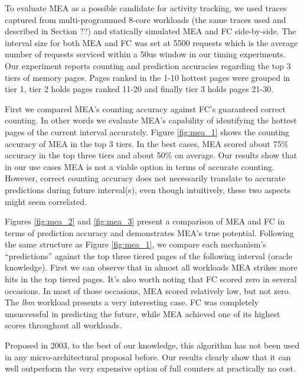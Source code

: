 To evaluate MEA as a possible candidate for activity tracking, we used traces captured from multi-programmed 8-core workloads (the same traces used and described in Section ??) and statically simulated MEA and FC side-by-side. The interval size for both MEA and FC was set at 5500 requests which is the average number of requests serviced within a 50us window in our timing experiments. Our experiment reports counting and prediction accuracies regarding the top 3 tiers of memory pages. Pages ranked in the 1-10 hottest pages were grouped in tier 1, tier 2 holds pages ranked 11-20 and finally tier 3 holds pages 21-30.

First we compared MEA's counting accuracy against FC's guaranteed correct counting. In other words we evaluate MEA's capability of identifying the hottest pages of the current interval accurately. Figure \ref{fig:mea_1} shows the counting accuracy of MEA in the top 3 tiers. In the best cases, MEA scored about 75\% accuracy in the top three tiers and about 50\% on average. Our results show that in our use cases MEA is not a viable option in terms of accurate counting. However, correct counting accuracy does not necessarily translate to accurate predictions during future interval(s), even though intuitively, these two aspects might seem correlated.

Figures \ref{fig:mea_2} and \ref{fig:mea_3} present a comparison of MEA and FC in terms of prediction accuracy and demonstrates MEA's true potential. Following the same structure as Figure \ref{fig:mea_1}, we compare each mechanism's ``predictions'' against the top three tiered pages of the following interval (oracle knowledge). First we can observe that in almost all workloads MEA strikes more hits in the top tiered pages. It's also worth noting that FC scored zero in several occasions. In most of those occasions, MEA scored relatively low, but not zero. The \textit{lbm} workload presents a very interesting case. FC was completely unsuccessful in predicting the future, while MEA achieved one of its highest scores throughout all workloads.

Proposed in 2003, to the best of our knowledge, this algorithm has not been used in any micro-architectural proposal before. Our results clearly show that it can well outperform the very expensive option of full counters at practically no cost.
